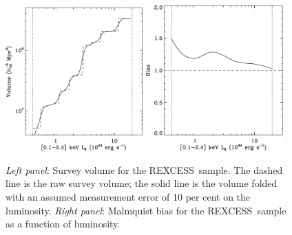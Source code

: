 \documentclass[oldversion]{aa}
\newcommand{\rexcess}{{\gwpfont REXCESS}}
\begin{document}
\begin{figure}[]
\includegraphics[width=0.47\textwidth]{0944fb1a.eps}
\hfill
\includegraphics[width=0.47\textwidth]{0944fb1b.eps}
\caption{{\footnotesize {\it Left panel}: Survey volume for the \rexcess\ sample. The dashed line is the raw survey volume; the solid line is the volume folded with an assumed measurement error of 10 per cent on the luminosity. {\it Right panel}: Malmquist bias for the \rexcess\ sample as a function of luminosity.  }}\label{fig:volbias} 
   \end{figure}
\end{document}
